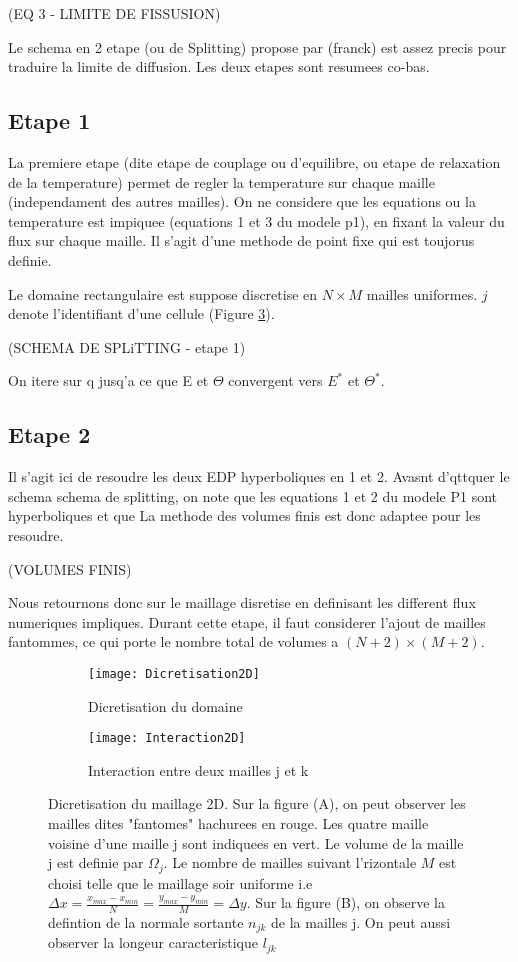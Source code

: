 (EQ 3 - LIMITE DE FISSUSION)

Le schema en 2 etape (ou de Splitting) propose par (franck) est assez precis pour traduire la limite de diffusion. Les deux etapes sont resumees co-bas.


\subsection{Etape 1}
La premiere etape (dite etape de couplage ou d'equilibre, ou etape de relaxation de la temperature) permet de regler la temperature sur chaque maille (independament des autres mailles). On ne considere que les equations ou la temperature est impiquee (equations 1 et 3 du modele p1), en fixant la valeur du flux sur chaque maille. Il s'agit d'une methode de point fixe qui est toujorus definie. \parencite{Reference2}

Le domaine rectangulaire est suppose discretise en $N \times M$ mailles uniformes. $j$ denote l'identifiant d'une cellule (Figure \ref{fig:2DMesh}).

(SCHEMA DE SPLiTTING - etape 1)

On itere sur q jusq'a ce que E et $\Theta$ convergent vers $E^*$ et $\Theta^*$.

\subsection{Etape 2}
Il s'agit ici de resoudre les deux EDP hyperboliques en 1 et 2. 
Avasnt d'qttquer le schema schema de splitting, on note que les equations 1 et 2 du modele P1 sont hyperboliques et que La methode des volumes finis est donc adaptee pour les resoudre.

(VOLUMES FINIS)

Nous retournons donc sur le maillage disretise en definisant les different flux numeriques impliques. Durant cette etape, il faut considerer l'ajout de mailles fantommes, ce qui porte le nombre total de volumes a $(N+2) \times (M+2)$.

\begin{figure}[H]
\begin{subfigure}{.6\textwidth}
  \centering
  \texttt{[image: Dicretisation2D]}  
  \caption{Dicretisation du domaine}
  \label{fig:Discretisation2D}
\end{subfigure}
\begin{subfigure}{.4\textwidth}
  \centering
  \texttt{[image: Interaction2D]}  
  \caption{Interaction entre deux mailles j et k}
  \label{fig:Interaction2D}
\end{subfigure}
\decoRule
\caption{Dicretisation du maillage 2D. Sur la figure (A), on peut observer les mailles dites "fantomes" hachurees en rouge. Les quatre maille voisine d'une maille j sont indiquees en vert. Le volume de la maille j est definie par $\Omega_j$. Le nombre de mailles suivant l'rizontale $M$ est choisi telle que le maillage soir uniforme i.e $\Delta x = \frac{x_{max}-x_{min}}{N} = \frac{y_{max}-y_{min}}{M} = \Delta y$. Sur la figure (B), on observe la defintion de la normale sortante $n_{jk}$ de la mailles j. On peut aussi observer la longeur caracteristique $l_{jk}$}
\label{fig:2DMesh}
\end{figure}

